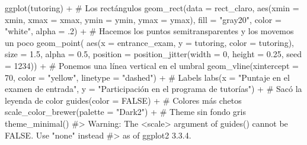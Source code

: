 \documentclass[
  letterpaper,
  DIV=11,
  numbers=noendperiod,
  oneside]{scrreprt}
\newenvironment{Shaded}{\begin{snugshade}}{\end{snugshade}}
\newcommand{\AttributeTok}[1]{\textcolor[rgb]{0.40,0.45,0.13}{#1}}
\newcommand{\CommentTok}[1]{\textcolor[rgb]{0.37,0.37,0.37}{#1}}
\newcommand{\ConstantTok}[1]{\textcolor[rgb]{0.56,0.35,0.01}{#1}}
\newcommand{\DecValTok}[1]{\textcolor[rgb]{0.68,0.00,0.00}{#1}}
\newcommand{\FloatTok}[1]{\textcolor[rgb]{0.68,0.00,0.00}{#1}}
\newcommand{\FunctionTok}[1]{\textcolor[rgb]{0.28,0.35,0.67}{#1}}
\newcommand{\NormalTok}[1]{\textcolor[rgb]{0.00,0.23,0.31}{#1}}
\newcommand{\SpecialCharTok}[1]{\textcolor[rgb]{0.37,0.37,0.37}{#1}}
\newcommand{\StringTok}[1]{\textcolor[rgb]{0.13,0.47,0.30}{#1}}
\begin{document}
\begin{Shaded}
\begin{Highlighting}[]
\FunctionTok{ggplot}\NormalTok{(tutoring) }\SpecialCharTok{+}
  \CommentTok{\# Los rectángulos}
  \FunctionTok{geom\_rect}\NormalTok{(}\AttributeTok{data =}\NormalTok{ rect\_claro, }\FunctionTok{aes}\NormalTok{(}\AttributeTok{xmin =}\NormalTok{ xmin, }\AttributeTok{xmax =}\NormalTok{ xmax, }\AttributeTok{ymin =}\NormalTok{ ymin, }\AttributeTok{ymax =}\NormalTok{ ymax), }
            \AttributeTok{fill =} \StringTok{"gray20"}\NormalTok{, }\AttributeTok{color =} \StringTok{"white"}\NormalTok{, }\AttributeTok{alpha =}\NormalTok{ .}\DecValTok{2}\NormalTok{) }\SpecialCharTok{+}
  \CommentTok{\# Hacemos los puntos semitransparentes y los movemos un poco}
  \FunctionTok{geom\_point}\NormalTok{( }\FunctionTok{aes}\NormalTok{(}\AttributeTok{x =}\NormalTok{ entrance\_exam, }
                  \AttributeTok{y =}\NormalTok{ tutoring, }
                  \AttributeTok{color =}\NormalTok{ tutoring),}
              \AttributeTok{size =} \FloatTok{1.5}\NormalTok{, }\AttributeTok{alpha =} \FloatTok{0.5}\NormalTok{, }
             \AttributeTok{position =} \FunctionTok{position\_jitter}\NormalTok{(}\AttributeTok{width =} \DecValTok{0}\NormalTok{, }\AttributeTok{height =} \FloatTok{0.25}\NormalTok{, }\AttributeTok{seed =} \DecValTok{1234}\NormalTok{)) }\SpecialCharTok{+} 
  \CommentTok{\# Ponemos una línea vertical en el umbral}
  \FunctionTok{geom\_vline}\NormalTok{(}\AttributeTok{xintercept =} \DecValTok{70}\NormalTok{, }\AttributeTok{color =} \StringTok{"yellow"}\NormalTok{, }\AttributeTok{linetype =} \StringTok{"dashed"}\NormalTok{) }\SpecialCharTok{+} 
  \CommentTok{\# Labels}
  \FunctionTok{labs}\NormalTok{(}\AttributeTok{x =} \StringTok{"Puntaje en el examen de entrada"}\NormalTok{, }\AttributeTok{y =} \StringTok{"Participación en el programa de tutorías"}\NormalTok{) }\SpecialCharTok{+} 
  \CommentTok{\# Sacó la leyenda de color}
  \FunctionTok{guides}\NormalTok{(}\AttributeTok{color =} \ConstantTok{FALSE}\NormalTok{) }\SpecialCharTok{+}
  \CommentTok{\# Colores más chetos}
  \FunctionTok{scale\_color\_brewer}\NormalTok{(}\AttributeTok{palette =} \StringTok{"Dark2"}\NormalTok{) }\SpecialCharTok{+}
  \CommentTok{\# Theme sin fondo gris}
  \FunctionTok{theme\_minimal}\NormalTok{()}
\CommentTok{\#\textgreater{} Warning: The \textasciigrave{}\textless{}scale\textgreater{}\textasciigrave{} argument of \textasciigrave{}guides()\textasciigrave{} cannot be \textasciigrave{}FALSE\textasciigrave{}. Use "none" instead}
\CommentTok{\#\textgreater{} as of ggplot2 3.3.4.}
\end{Highlighting}
\end{Shaded}
\end{document}
